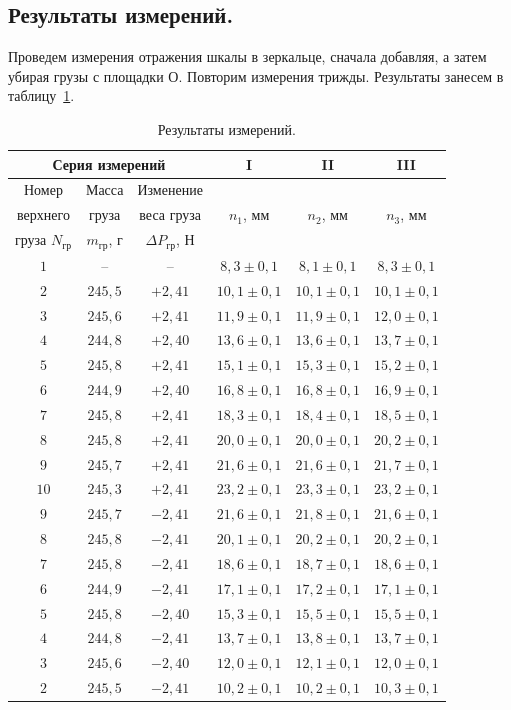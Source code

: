 \documentclass[a4paper,11pt]{article}
\begin{document}
\subsection{Результаты измерений.}
Проведем измерения отражения шкалы в зеркальце, сначала добавляя, а затем убирая грузы с площадки $О$. Повторим измерения трижды. Результаты занесем в таблицу~\ref{table:tab1}.
\begin{table}[h!]
\centering
\begin{tabular}{ ||c|c|c|c|c|c|| }
  \hline
  \multicolumn{3}{||c|}{Серия измерений} & I & II & III \\
  \hline
  Номер & Масса & Изменение & & & \\
  верхнего & груза & веса груза & $n_{1}$, $мм$ & $n_{2}$, $мм$ & $n_{3}$, $мм$ \\
  груза $N_{гр}$ & $m_{гр}$, $г$ & $\Delta P_{гр}$, $Н$ & & & \\
  \hline
  $1$ & -- & -- & $8,3 \pm 0,1$ & $8,1 \pm 0,1$ & $8,3 \pm 0,1$ \\
  $2$ & $245,5$ & $+2,41$ & $10,1 \pm 0,1$ & $10,1 \pm 0,1$ & $10,1 \pm 0,1$ \\
  $3$ & $245,6$ & $+2,41$ & $11,9 \pm 0,1$ & $11,9 \pm 0,1$ & $12,0 \pm 0,1$ \\
  $4$ & $244,8$ & $+2,40$ & $13,6 \pm 0,1$ & $13,6 \pm 0,1$ & $13,7 \pm 0,1$ \\
  $5$ & $245,8$ & $+2,41$ & $15,1 \pm 0,1$ & $15,3 \pm 0,1$ & $15,2 \pm 0,1$ \\
  $6$ & $244,9$ & $+2,40$ & $16,8 \pm 0,1$ & $16,8 \pm 0,1$ & $16,9 \pm 0,1$ \\
  $7$ & $245,8$ & $+2,41$ & $18,3 \pm 0,1$ & $18,4 \pm 0,1$ & $18,5 \pm 0,1$ \\
  $8$ & $245,8$ & $+2,41$ & $20,0 \pm 0,1$ & $20,0 \pm 0,1$ & $20,2 \pm 0,1$ \\
  $9$ & $245,7$ & $+2,41$ & $21,6 \pm 0,1$ & $21,6 \pm 0,1$ & $21,7 \pm 0,1$ \\
  $10$ & $245,3$ & $+2,41$ & $23,2 \pm 0,1$ & $23,3 \pm 0,1$ & $23,2 \pm 0,1$ \\
  $9$ & $245,7$ & $-2,41$ & $21,6 \pm 0,1$ & $21,8 \pm 0,1$ & $21,6 \pm 0,1$ \\
  $8$ & $245,8$ & $-2,41$ & $20,1 \pm 0,1$ & $20,2 \pm 0,1$ & $20,2 \pm 0,1$ \\
  $7$ & $245,8$ & $-2,41$ & $18,6 \pm 0,1$ & $18,7 \pm 0,1$ & $18,6 \pm 0,1$ \\
  $6$ & $244,9$ & $-2,41$ & $17,1 \pm 0,1$ & $17,2 \pm 0,1$ & $17,1 \pm 0,1$ \\
  $5$ & $245,8$ & $-2,40$ & $15,3 \pm 0,1$ & $15,5 \pm 0,1$ & $15,5 \pm 0,1$ \\
  $4$ & $244,8$ & $-2,41$ & $13,7 \pm 0,1$ & $13,8 \pm 0,1$ & $13,7 \pm 0,1$ \\
  $3$ & $245,6$ & $-2,40$ & $12,0 \pm 0,1$ & $12,1 \pm 0,1$ & $12,0 \pm 0,1$ \\
  $2$ & $245,5$ & $-2,41$ & $10,2 \pm 0,1$ & $10,2 \pm 0,1$ & $10,3 \pm 0,1$ \\
  \hline
\end{tabular}
\caption{Результаты измерений.}
\label{table:tab1}
\end{table}
\end{document}
